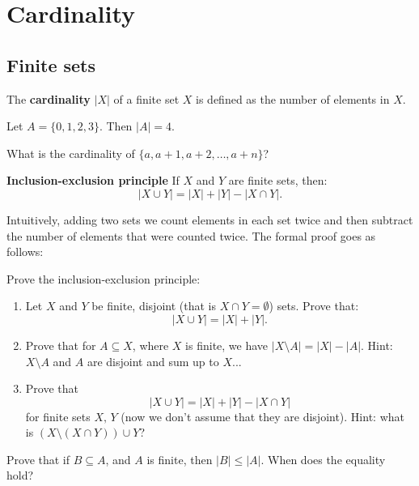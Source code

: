 \section{Cardinality}
\subsection{Finite sets}
\begin{definition}
  The \textbf{cardinality} $|X|$ of a finite set $X$ is defined as the number of elements in $X$.
\end{definition}

\begin{example}
  Let $A=\{0,1,2,3\}$. Then $|A|=4$.
\end{example}

\begin{exercise}
	What is the cardinality of $\{a, a+1, a+2, \dots, a+n\}$?
\end{exercise}

\begin{theorem}
  \textbf{Inclusion-exclusion principle}
  If $X$ and $Y$ are finite sets, then:
  $$|X\cup Y|=|X|+|Y|-|X\cap Y|.$$
\end{theorem}

Intuitively, adding two sets we count elements in each set twice and then subtract the number of elements that were counted twice. The formal proof goes as follows:

\begin{exercise}
  Prove the inclusion-exclusion principle:

  \begin{enumerate}
    \item Let $X$ and $Y$ be finite, disjoint (that is $X\cap Y=\emptyset$) sets. Prove that:
    $$|X\cup Y| = |X| + |Y|.$$
    \item Prove that for $A\subseteq X$, where $X$ is finite, we have $|X\setminus A|=|X|-|A|$. Hint: $X\setminus A$ and $A$ are disjoint and sum up to $X$...
    \item Prove that $$|X\cup Y|=|X|+|Y|-|X\cap Y|$$ for finite sets $X,\, Y$ (now we don't assume that they are disjoint). Hint: what is $(X\setminus(X\cap Y))\cup Y$?
  \end{enumerate}
\end{exercise}

\begin{exercise}
  Prove that if $B\subseteq A$, and $A$ is finite, then $|B|\le |A|$. When does the equality hold?
\end{exercise}

